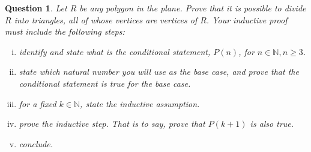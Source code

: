 \documentclass[12pt]{article}
\newtheorem{question}[thm]{Question}
\def\Natural{\mathbb{N}}
\begin{document}
\begin{question}	
	\normalfont
Let $R$ be any polygon in the plane. Prove that it is possible to divide $R$ into triangles, all of whose vertices are vertices of $R$.
Your inductive proof must include the following steps:
	\begin{enumerate}[(i)]
		\item identify and state what is the conditional statement, $P(n)$, for $n\in \Natural, n \geq 3$.
		\item state which natural number you will use as the base case, and prove that the conditional statement is true for the base case.
		\item for a fixed $k\in\Natural$, state the inductive assumption.
		\item prove the inductive step.  That is to say, prove that $P(k+1)$ is also true.
		\item conclude.
	\end{enumerate}
\end{question}








\end{document}
